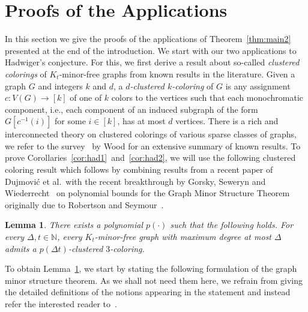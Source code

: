 \documentclass[10pt]{amsart}
\newtheorem{lemma}[theorem]{Lemma}
\theoremstyle{definition}
\begin{document}

\section{Proofs of the Applications}\label{sec:applications}
In this section we give the proofs of the applications of Theorem~\ref{thm:main2} presented at the end of the introduction. We start with our two applications to Hadwiger's conjecture. For this, we first derive a result about so-called \emph{clustered colorings} of $K_t$-minor-free graphs from known results in the literature. Given a graph $G$ and integers $k$ and $d$, a \emph{$d$-clustered $k$-coloring} of $G$ is any assignment $c:V(G)\rightarrow [k]$ of one of $k$ colors to the vertices such that each monochromatic component, i.e., each component of an induced subgraph of the form $G[c^{-1}(i)]$ for some $i\in [k]$, has at most $d$ vertices. There is a rich and interconnected theory on clustered colorings of various sparse classes of graphs, we refer to the survey~\cite{wood} by Wood for an extensive summary of known results.  To prove Corollaries~\ref{cor:had1}~and~\ref{cor:had2}, we will use the following clustered coloring result which follows by combining results from a recent paper of Dujmovi\'{c} et al.~with the recent breakthrough by Gorsky, Seweryn and Wiederrecht~\cite{gowi} on polynomial bounds for the Graph Minor Structure Theorem originally due to Robertson and Seymour~\cite{RS}.
\begin{lemma}\label{lem:Ktdecomposition}
There exists a polynomial $p(\cdot)$ such that the following holds. For every $\Delta, t\in \mathbb{N}$, every $K_t$-minor-free graph with maximum degree at most $\Delta$ admits a $p(\Delta t)$-clustered $3$-coloring.
\end{lemma}
To obtain Lemma~\ref{lem:Ktdecomposition}, we start by stating the following formulation of the graph minor structure theorem. As we shall not need them here, we refrain from giving the detailed definitions of the notions appearing in the statement and instead refer the interested reader to~\cite{dujmovic}.
\end{document}
